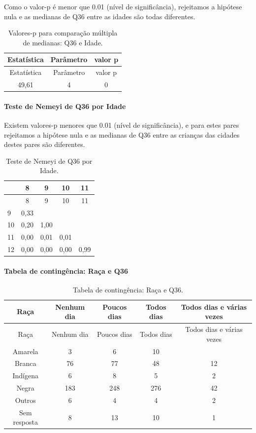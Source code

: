 \documentclass[]{article}
\let\oldparagraph\paragraph
\renewcommand{\paragraph}[1]{\oldparagraph{#1}\mbox{}}
\begin{document}
Como o valor-p é menor que 0.01 (nível de significância), rejeitamos a hipótese nula e as medianas de Q36 entre as idades são todas diferentes.

\begin{longtable}[]{@{}ccc@{}}
\caption{\label{tab:unnamed-chunk-1337}Valores-p para comparação múltipla de medianas: Q36 e Idade.}\tabularnewline
\toprule
Estatística & Parâmetro & valor p\tabularnewline
\midrule
\endfirsthead
\toprule
Estatística & Parâmetro & valor p\tabularnewline
\midrule
\endhead
49,61 & 4 & 0\tabularnewline
\bottomrule
\end{longtable}

\hypertarget{teste-de-nemeyi-de-q36-por-idade}{%
\paragraph{Teste de Nemeyi de Q36 por Idade}\label{teste-de-nemeyi-de-q36-por-idade}}

Existem valores-p menores que 0.01 (nível de significância), e para estes pares rejeitamos a hipótese nula e as medianas de Q36 entre as crianças das cidades destes pares são diferentes.

\begin{longtable}[]{@{}lcccc@{}}
\caption{\label{tab:unnamed-chunk-1339}Teste de Nemeyi de Q36 por Idade.}\tabularnewline
\toprule
& 8 & 9 & 10 & 11\tabularnewline
\midrule
\endfirsthead
\toprule
& 8 & 9 & 10 & 11\tabularnewline
\midrule
\endhead
9 & 0,33 & & &\tabularnewline
10 & 0,20 & 1,00 & &\tabularnewline
11 & 0,00 & 0,01 & 0,01 &\tabularnewline
12 & 0,00 & 0,00 & 0,00 & 0,99\tabularnewline
\bottomrule
\end{longtable}

\cleardoublepage

\hypertarget{tabela-de-continguxeancia-rauxe7a-e-q36}{%
\paragraph{Tabela de contingência: Raça e Q36}\label{tabela-de-continguxeancia-rauxe7a-e-q36}}

\begin{longtable}[]{@{}ccccc@{}}
\caption{\label{tab:unnamed-chunk-1340}Tabela de contingência: Raça e Q36.}\tabularnewline
\toprule
Raça & Nenhum dia & Poucos dias & Todos dias & Todos dias e várias vezes\tabularnewline
\midrule
\endfirsthead
\toprule
Raça & Nenhum dia & Poucos dias & Todos dias & Todos dias e várias vezes\tabularnewline
\midrule
\endhead
Amarela & 3 & 6 & 10 &\tabularnewline
Branca & 76 & 77 & 48 & 12\tabularnewline
Indígena & 6 & 8 & 5 & 2\tabularnewline
Negra & 183 & 248 & 276 & 42\tabularnewline
Outros & 6 & 4 & 4 & 2\tabularnewline
Sem resposta & 8 & 13 & 10 & 1\tabularnewline
\bottomrule
\end{longtable}
\end{document}
